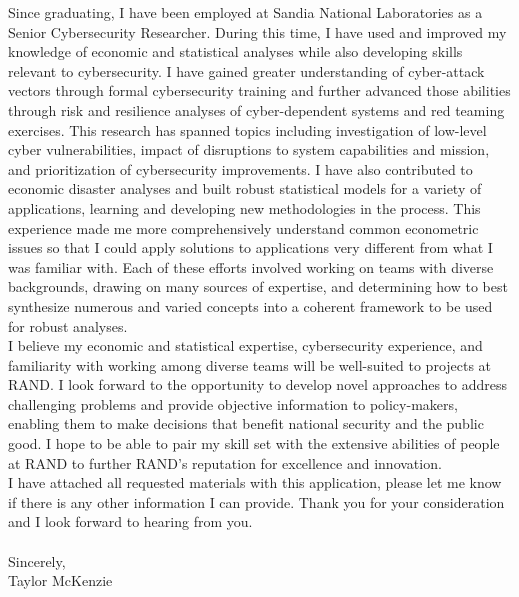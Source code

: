 \documentclass[]{article}
\begin{document}
Since graduating, I have been employed at Sandia National Laboratories as a Senior Cybersecurity Researcher. During this time, I have used and improved my knowledge of economic and statistical analyses while also developing skills relevant to cybersecurity. I have gained greater understanding of cyber-attack vectors through formal cybersecurity training and further advanced those abilities through risk and resilience analyses of cyber-dependent systems and red teaming exercises. This research has spanned topics including investigation of low-level cyber vulnerabilities, impact of disruptions to system capabilities and mission, and prioritization of cybersecurity improvements. I have also contributed to economic disaster analyses and built robust statistical models for a variety of applications, learning and developing new methodologies in the process. This experience made me more comprehensively understand common econometric issues so that I could apply solutions to applications very different from what I was familiar with. Each of these efforts involved working on teams with diverse backgrounds, drawing on many sources of expertise, and determining how to best synthesize numerous and varied concepts into a coherent framework to be used for robust analyses.\\

I believe my economic and statistical expertise, cybersecurity experience, and familiarity with working among diverse teams will be well-suited to projects at RAND. I look forward to the opportunity to develop novel approaches to address challenging problems and provide objective information to policy-makers, enabling them to make decisions that benefit national security and the public good. I hope to be able to pair my skill set with the extensive abilities of people at RAND to further RAND's reputation for excellence and innovation.\\

I have attached all requested materials with this application, please let me know if there is any other information I can provide. Thank you for your consideration and I look forward to hearing from you.\\\\


\noindent Sincerely,\\

\noindent Taylor McKenzie
\end{document}
